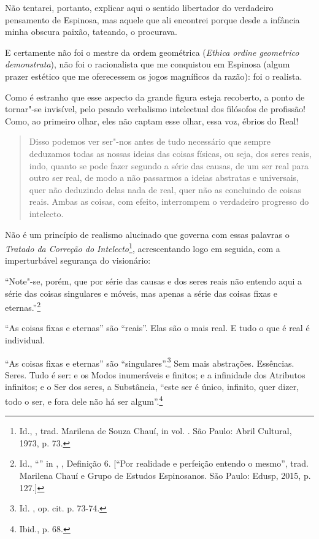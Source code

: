 Não tentarei, portanto, explicar aqui o sentido libertador do verdadeiro
pensamento de Espinosa, mas aquele que ali encontrei porque desde a
infância minha obscura paixão, tateando, o procurava.

E certamente não foi o mestre da ordem geométrica (\emph{Ethica ordine
geometrico demonstrata}), não foi o racionalista que me conquistou em
Espinosa (algum prazer estético que me oferecessem os jogos magníficos
da razão): foi o realista.

Como é estranho que esse aspecto da grande figura esteja recoberto, a
ponto de tornar"-se invisível, pelo pesado verbalismo intelectual dos
filósofos de profissão! Como, ao primeiro olhar, eles não captam esse
olhar, essa voz, ébrios do Real!

\begin{quote}
Disso podemos ver ser"-nos antes de tudo necessário que sempre deduzamos
todas as nossas ideias das coisas físicas, ou seja, dos seres reais,
indo, quanto se pode fazer segundo a série das causas, de um ser real
para outro ser real, de modo a não passarmos a ideias abstratas e
universais, quer não deduzindo delas nada de real, quer não as
concluindo de coisas reais. Ambas as coisas, com efeito, interrompem o
verdadeiro progresso do intelecto.
\end{quote}

Não é um princípio de realismo alucinado que governa com essas palavras
o \emph{Tratado da Correção do Intelecto}\footnote{Id., {}, trad. Marilena de Souza Chauí, in {} vol. \scalebox{0.8}{XVII}. São Paulo: Abril Cultural, 1973, p. 73.},
acrescentando logo em seguida, com a imperturbável segurança do
visionário:

``Note"-se, porém, que por série das causas e dos seres reais
não entendo aqui a série das coisas singulares e móveis, mas apenas a
série das coisas fixas e eternas.''\footnote{Id., ``{}'' in {}, \scalebox{0.8}{II}, Definição 6.
  {[}``Por realidade e perfeição entendo o mesmo'', trad. Marilena Chauí
  e Grupo de Estudos Espinosanos. São Paulo: Edusp, 2015, p. 127.{]}}

``As coisas fixas e eternas'' são ``reais''. Elas são o mais real. E
tudo o que é real é individual.

``As coisas fixas e eternas'' são
``singulares''.\footnote{Id. {},
  op. cit. p. 73-74.} Sem mais abstrações. Essências. Seres. Tudo é ser:
e os Modos inumeráveis e finitos; e a infinidade dos Atributos
infinitos; e o Ser dos seres, a Substância, ``este ser é único,
infinito, quer dizer, todo o ser, e fora dele não há ser
algum''.\footnote{Ibid., p. 68.}

